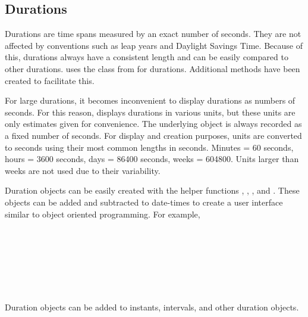 \documentclass[article]{jss}
\begin{document}
\subsection{Durations}
\label{sec:durations}
Durations are time spans measured by an exact number of seconds. They are not affected by conventions such as leap years and Daylight Savings Time. Because of this, durations always have a consistent length and can be easily compared to other durations.  uses the  class from  for durations. Additional  methods have been created to facilitate this. 

For large durations, it becomes inconvenient to display durations as numbers of seconds. For this reason,  displays durations in various units, but these units are only estimates given for convenience. The underlying object is always recorded as a fixed number of seconds. For display and creation purposes, units are converted to seconds using their most common lengths in seconds. Minutes = 60 seconds, hours = 3600 seconds, days = 86400 seconds, weeks = 604800. Units larger than weeks are not used due to their variability.

Duration objects can be easily created with the helper functions 
, , , and  . These objects can be added and subtracted to date-times to create a user interface similar to object oriented programming. For example,\\

\\
\\

\\
\\

\\
\\
\\

Duration objects can be added to instants, intervals, and other duration objects. \\

\\
\\
\\
\\
\end{document}

